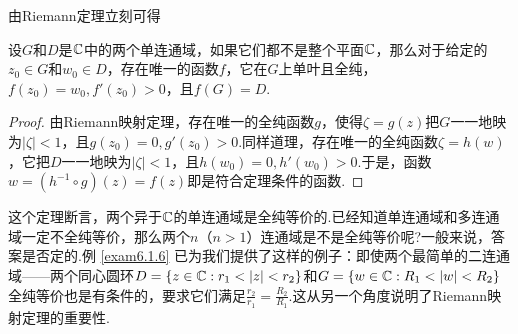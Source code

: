 由Riemann定理立刻可得
\begin{theorem}\label{thm7.2.2}
  设$G$和$D$是$\mathbb C$中的两个单连通域，如果它们都不是整个平面$\mathbb C$，那么对于给定的$z_0\in G$和$w_0\in D$，存在唯一的函数$f$，它在$G$上单叶且全纯，$f(z_0)=w_0,f'(z_0)>0$，且$f(G)=D$.
\end{theorem}
\begin{proof}
  由Riemann映射定理，存在唯一的全纯函数$g$，使得$\zeta=g(z)$把$G$一一地映为$|\zeta|<1$，且$g(z_0)=0,g'(z_0)>0$.同样道理，存在唯一的全纯函数$\zeta=h(w)$，它把$D$一一地映为$|\zeta|<1$，且$h(w_0)=0,h'(w_0)>0$.于是，函数$w=(h^{-1}\circ g)(z)=f(z)$即是符合定理条件的函数.
\end{proof}

这个定理断言，两个异于$\mathbb C$的单连通域是全纯等价的.已经知道单连通域和多连通域一定不全纯等价，那么两个$n$（$n>1$）连通域是不是全纯等价呢?一般来说，答案是否定的.例 \ref{exam6.1.6} 已为我们提供了这样的例子：即使两个最简单的二连通域——两个同心圆环$D=\{z\in\MC:r_1<|z|<r_2\}$和$G=\{w\in\MC:R_1<|w| <R_2\}$全纯等价也是有条件的，要求它们满足$\frac{r_2}{r_1}=\frac{R_2}{R_1}$.这从另一个角度说明了Riemann映射定理的重要性.

